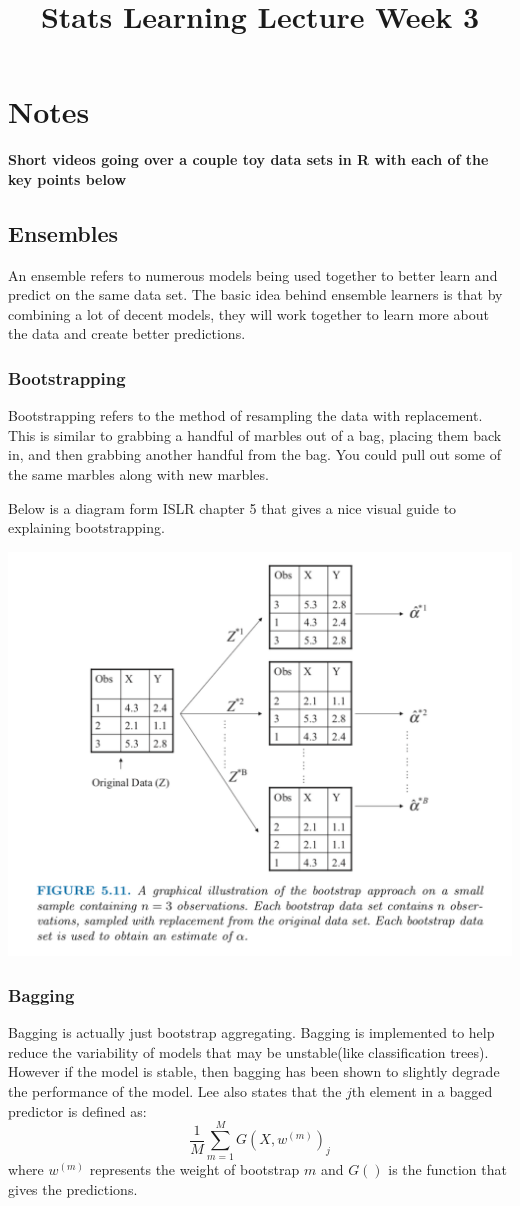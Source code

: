 \documentclass[a4paper]{article}
\title{Stats Learning Lecture Week 3}
\begin{document}
\section{Notes}
\textbf{Short videos going over a couple toy data sets in R with each of the key points below}

\subsection{Ensembles}
  An ensemble refers to numerous models being used together to better learn and predict on the same data set. The basic idea behind ensemble learners is that by combining a lot of decent models, they will work together to learn more about the data and create better predictions.
    \subsubsection{Bootstrapping}
    
    Bootstrapping refers to the method of resampling the data with replacement. This is similar to grabbing a handful of marbles out of a bag, placing them back in, and then grabbing another handful from the bag. You could pull out some of the same marbles along with new marbles. 
   
   Below is a diagram form ISLR chapter 5 that gives a nice visual guide to explaining bootstrapping.
   
   \includegraphics[scale=0.7]{ISLR-boostrap_diagram.png}
   
    \subsubsection{Bagging}
    Bagging is actually just bootstrap aggregating. Bagging is implemented to help reduce the variability of models that may be unstable(like classification trees). However if the model is stable, then bagging has been shown to slightly degrade the performance of the model.
    Lee also states that the $j$th element in a bagged predictor is defined as:
    $$\frac{1}{M}\sum^M_{m=1}G(X,w^{(m)})_j$$
    where $w^{(m)}$ represents the weight of bootstrap $m$ and $G()$ is the function that gives the predictions.
\end{document}
